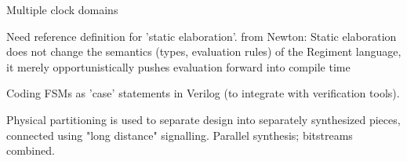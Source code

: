 Multiple clock domains

Need reference definition for 'static elaboration'.
from Newton: 
Static elaboration does not change the semantics (types, evaluation rules) of the
Regiment language, it merely opportunistically pushes evaluation forward into compile time

Coding FSMs as 'case' statements in Verilog (to integrate with verification tools).

Physical partitioning is used to separate design into separately synthesized pieces, connected using
"long distance" signalling.  Parallel synthesis; bitstreams combined.
